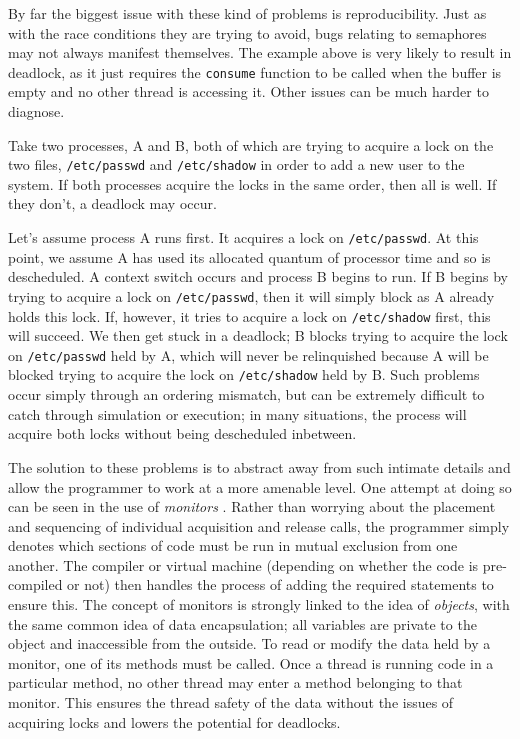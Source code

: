 By far the biggest issue with these kind of problems is
reproducibility.  Just as with the race conditions they are trying to
avoid, bugs relating to semaphores may not always manifest themselves.
The example above is very likely to result in deadlock, as it just
requires the \texttt{consume} function to be called when the buffer is
empty and no other thread is accessing it.  Other issues can be much
harder to diagnose.

Take two processes, A and B, both of which are trying to acquire a
lock on the two files, \texttt{/etc/passwd} and \texttt{/etc/shadow}
in order to add a new user to the system.  If both processes acquire
the locks in the same order, then all is well.  If they don't, a
deadlock may occur.

Let's assume process A runs first.  It acquires a lock on
\texttt{/etc/passwd}.  At this point, we assume A has used its
allocated quantum of processor time and so is descheduled.  A context
switch occurs and process B begins to run.  If B begins by trying to
acquire a lock on \texttt{/etc/passwd}, then it will simply block as A
already holds this lock.  If, however, it tries to acquire a lock on
\texttt{/etc/shadow} first, this will succeed.  We then get stuck in a
deadlock; B blocks trying to acquire the lock on \texttt{/etc/passwd}
held by A, which will never be relinquished because A will be blocked
trying to acquire the lock on \texttt{/etc/shadow} held by B.  Such
problems occur simply through an ordering mismatch, but can be
extremely difficult to catch through simulation or execution; in many
situations, the process will acquire both locks without being
descheduled inbetween.

The solution to these problems is to abstract away from such intimate
details and allow the programmer to work at a more amenable level.
One attempt at doing so can be seen in the use of \emph{monitors}
\cite{mon1,mon2}.  Rather than worrying about the placement and
sequencing of individual acquisition and release calls, the programmer
simply denotes which sections of code must be run in mutual exclusion
from one another.  The compiler or virtual machine (depending on
whether the code is pre-compiled or not) then handles the process of
adding the required statements to ensure this.  The concept of
monitors is strongly linked to the idea of \emph{objects}, with the
same common idea of data encapsulation; all variables are private to
the object and inaccessible from the outside.  To read or modify the
data held by a monitor, one of its methods must be called.  Once a
thread is running code in a particular method, no other thread may
enter a method belonging to that monitor.  This ensures the thread
safety of the data without the issues of acquiring locks and lowers
the potential for deadlocks.

